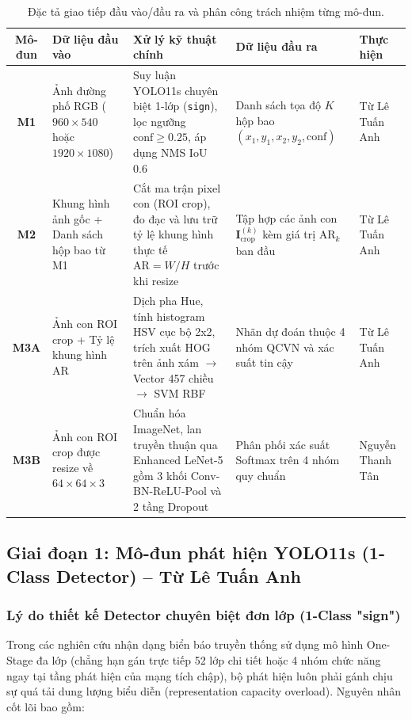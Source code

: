 \begin{table}[H]
\centering
\small
\caption{Đặc tả giao tiếp đầu vào/đầu ra và phân công trách nhiệm từng mô-đun.}
\label{tab:module_io_spec}
\begin{tabularx}{\textwidth}{|c|p{3.2cm}|p{3.8cm}|p{3.2cm}|Y|}
\hline
\textbf{Mô-đun} & \textbf{Dữ liệu đầu vào} & \textbf{Xử lý kỹ thuật chính} & \textbf{Dữ liệu đầu ra} & \textbf{Thực hiện} \\
\hline
\textbf{M1} & Ảnh đường phố RGB ($960\times 540$ hoặc $1920\times 1080$) & Suy luận YOLO11s chuyên biệt 1-lớp (\texttt{sign}), lọc ngưỡng $\text{conf} \ge 0.25$, áp dụng NMS IoU $0.6$ & Danh sách tọa độ $K$ hộp bao $(x_1, y_1, x_2, y_2, \text{conf})$ & Từ Lê Tuấn Anh \\
\hline
\textbf{M2} & Khung hình ảnh gốc + Danh sách hộp bao từ M1 & Cắt ma trận pixel con (ROI crop), đo đạc và lưu trữ tỷ lệ khung hình thực tế $\text{AR} = W/H$ trước khi resize & Tập hợp các ảnh con $\mathbf{I}^{(k)}_{\text{crop}}$ kèm giá trị $\text{AR}_k$ ban đầu & Từ Lê Tuấn Anh \\
\hline
\textbf{M3A} & Ảnh con ROI crop + Tỷ lệ khung hình $\text{AR}$ & Dịch pha Hue, tính histogram HSV cục bộ 2x2, trích xuất HOG trên ảnh xám $\rightarrow$ Vector 457 chiều $\rightarrow$ SVM RBF & Nhãn dự đoán thuộc 4 nhóm QCVN và xác suất tin cậy & Từ Lê Tuấn Anh \\
\hline
\textbf{M3B} & Ảnh con ROI crop được resize về $64\times 64\times 3$ & Chuẩn hóa ImageNet, lan truyền thuận qua Enhanced LeNet-5 gồm 3 khối Conv-BN-ReLU-Pool và 2 tầng Dropout & Phân phối xác suất Softmax trên 4 nhóm quy chuẩn & Nguyễn Thanh Tân \\
\hline
\end{tabularx}
\end{table}

\subsection{Giai đoạn 1: Mô-đun phát hiện YOLO11s (1-Class Detector) -- Từ Lê Tuấn Anh}
\label{subsec:stage1_yolo}

\subsubsection{Lý do thiết kế Detector chuyên biệt đơn lớp (1-Class "sign")}
\label{subsubsec:why_one_class}

Trong các nghiên cứu nhận dạng biển báo truyền thống sử dụng mô hình One-Stage đa lớp (chẳng hạn gán trực tiếp 52 lớp chi tiết hoặc 4 nhóm chức năng ngay tại tầng phát hiện của mạng tích chập), bộ phát hiện luôn phải gánh chịu sự quá tải dung lượng biểu diễn (representation capacity overload). Nguyên nhân cốt lõi bao gồm:

